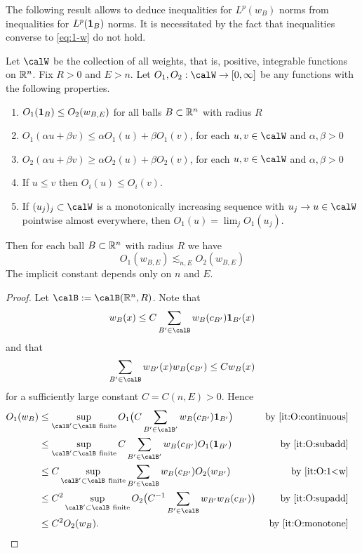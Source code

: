 The following result allows to deduce inequalities for $L^{p}(w_{B})$ norms from inequalities for $L^{p}(\mathbf{1}_{B})$ norms.
It is necessitated by the fact that inequalities converse to \eqref{eq:1-w} do not hold.
\begin{lemma}[{\cite[Lemma 4.1]{MR3592159}}]
\label{lem:1-w}
Let $\calW$ be the collection of all weights, that is, positive, integrable functions on $\mathbb{R}^n$.
Fix $R>0$ and $E>n$.
Let $O_1,O_2 : \calW\to[0,\infty]$ be any functions with the following properties.
\begin{enumerate}
\item\label{it:O:1<w} $O_1(\mathbf{1}_B)\leq O_2(w_{B,E})$ for all balls $B\subset \mathbb{R}^n$ with radius $R$
\item\label{it:O:subadd} $O_1(\alpha u+\beta v)\le \alpha O_1(u)+\beta O_1(v)$, for each $u,v\in\calW$ and $\alpha,\beta > 0$
\item\label{it:O:supadd} $O_2(\alpha u+\beta v)\ge \alpha O_2(u)+\beta O_2(v)$, for each $u,v\in\calW$ and $\alpha,\beta > 0$
\item\label{it:O:monotone} If $u\le v$ then $O_i(u)\le O_i(v)$.
\item\label{it:O:continuous} If $(u_{j})_{j} \subset \calW$ is a monotonically increasing sequence with $u_{j} \to u \in \calW$ pointwise almost everywhere, then $O_1(u) = \lim_{j} O_1(u_{j})$.
\end{enumerate}
Then for each ball $B \subset \mathbb{R}^{n}$ with radius $R$ we have
\[
O_1(w_{B,E})
\lesssim_{n,E}
O_2(w_{B,E})
\]
The implicit constant depends only on $n$ and $E$.
\end{lemma}

\begin{proof}
Let $\calB := \calB(\R^n,R)$.
Note that
\[
w_B(x)
\leq
C \sum_{B'\in\calB} w_B(c_{B'}) \one_{B'}(x)
\]
and that
\[
\sum_{B'\in\calB}w_{B'}(x)w_B(c_{B'})
\leq
C w_B(x)
\]
for a sufficiently large constant $C=C(n,E)>0$.
Hence
\begin{align*}
O_{1}(w_{B})
&\leq
\sup_{\calB' \subset \calB \ \textrm{finite}} O_{1}\bigl( C \sum_{B'\in\calB'} w_B(c_{B'}) \one_{B'} \bigr)
&\text{by \eqref{it:O:continuous}}\\
&\leq
\sup_{\calB' \subset \calB \ \textrm{finite}} C \sum_{B'\in\calB'} w_B(c_{B'}) O_{1}( \one_{B'} )
&\text{by \eqref{it:O:subadd}}\\
&\leq
C \sup_{\calB' \subset \calB \ \textrm{finite}} \sum_{B'\in\calB} w_B(c_{B'}) O_{2}(w_{B'})
&\text{by \eqref{it:O:1<w}}\\
&\leq
C^{2} \sup_{\calB' \subset \calB \ \textrm{finite}} O_{2}\bigl( C^{-1} \sum_{B'\in\calB} w_{B'} w_B(c_{B'}) \bigr)
&\text{by \eqref{it:O:supadd}}\\
&\leq
C^{2} O_{2}(w_{B}).
&\text{by \eqref{it:O:monotone}}
&\qedhere
\end{align*}
\end{proof}

